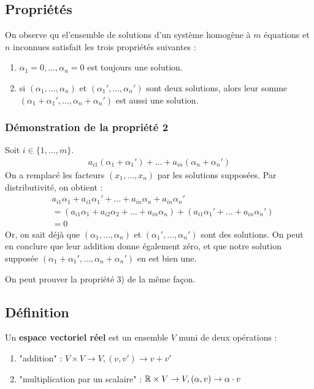\documentclass[12pt]{article}
\begin{document}
\pagebreak
\subsection{Propriétés}
On observe qu el'ensemble de solutions d'un système homogène à $m$ équations et $n$ inconnues satisfait les trois propriétés suivantes :
\begin{enumerate}
    \item $\alpha_1 = 0, \dots, \alpha_n = 0$ est toujours une solution.
    \item si $(\alpha_1, \dots, \alpha_n)$ et $(\alpha_1', \dots, \alpha_n')$ 
    sont deux solutions, alors leur somme $(\alpha_1+\alpha_1', \dots, \alpha_n+\alpha_n')$ est aussi une solution.
\end{enumerate}
\subsubsection{Démonstration de la propriété 2}
Soit $i \in \{1, \dots, m\}$.
$$\begin{aligned}
a_{i1}(\alpha_1+\alpha_1') + \dots + a_{in}(\alpha_n+\alpha_n')
\end{aligned}
$$
On a remplacé les facteurs $(x_1, \dots, x_n)$ par les solutions supposées.
Par distributivité, on obtient :
$$\begin{aligned}
    &a_{i1}\alpha_1 + a_{i1}\alpha_1' + \dots + a_{in}\alpha_n + a_{in}\alpha_n' \\
    &= (a_{i1}\alpha_{1}+a_{i2}\alpha_2+\dots+a_{in}\alpha_n) + (a_{i1}\alpha_{1}'+\dots+a_{in}\alpha_n') \\
    &= 0 
\end{aligned}
$$
Or, on sait déjà que $(\alpha_1, \dots, \alpha_n)$ et $(\alpha_1', \dots, \alpha_n')$ sont des solutions. On peut en conclure que leur addition donne également zéro, et que notre solution supposée $(\alpha_1 + \alpha_1', \dots, \alpha_n + \alpha_n')$ en est bien une.

On peut prouver la propriété 3) de la même façon.

\pagebreak
\subsection{Définition}
Un \textbf{espace vectoriel réel} est un ensemble $V$ muni de deux opérations :
\begin{enumerate}
    \item "addition" : $V \times V \rightarrow V, (v, v') \rightarrow v + v'$
    \item "multiplication par un scalaire" : $\mathbb{R} \times V \rightarrow V, (\alpha, v) \rightarrow \alpha \cdot v$ 
\end{enumerate}
\end{document}

